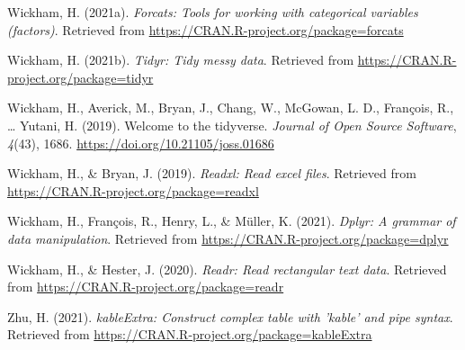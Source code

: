 \documentclass[
  english,
  man]{apa6}
\newlength{\cslhangindent}
\newenvironment{CSLReferences}[2] %
 {%
  \setlength{\parindent}{0pt}
  \ifodd #1 \everypar{\setlength{\hangindent}{\cslhangindent}}\ignorespaces\fi
  \ifnum #2 > 0
  \setlength{\parskip}{#2\baselineskip}
  \fi
 }%
 {}
\begin{document}
\begin{CSLReferences}{1}{0}
\leavevmode{}%
Wickham, H. (2021a). \emph{Forcats: Tools for working with categorical variables (factors)}. Retrieved from \url{https://CRAN.R-project.org/package=forcats}

\leavevmode{}%
Wickham, H. (2021b). \emph{Tidyr: Tidy messy data}. Retrieved from \url{https://CRAN.R-project.org/package=tidyr}

\leavevmode{}%
Wickham, H., Averick, M., Bryan, J., Chang, W., McGowan, L. D., François, R., \ldots{} Yutani, H. (2019). Welcome to the {tidyverse}. \emph{Journal of Open Source Software}, \emph{4}(43), 1686. \url{https://doi.org/10.21105/joss.01686}

\leavevmode{}%
Wickham, H., \& Bryan, J. (2019). \emph{Readxl: Read excel files}. Retrieved from \url{https://CRAN.R-project.org/package=readxl}

\leavevmode{}%
Wickham, H., François, R., Henry, L., \& Müller, K. (2021). \emph{Dplyr: A grammar of data manipulation}. Retrieved from \url{https://CRAN.R-project.org/package=dplyr}

\leavevmode{}%
Wickham, H., \& Hester, J. (2020). \emph{Readr: Read rectangular text data}. Retrieved from \url{https://CRAN.R-project.org/package=readr}

\leavevmode{}%
Zhu, H. (2021). \emph{kableExtra: Construct complex table with 'kable' and pipe syntax}. Retrieved from \url{https://CRAN.R-project.org/package=kableExtra}

\end{CSLReferences}

\endgroup
\end{document}
